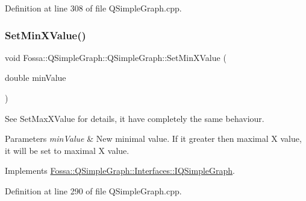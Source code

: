 Definition at line 308 of file Q\+Simple\+Graph.\+cpp.

\mbox{\label{class_fossa_1_1_q_simple_graph_1_1_q_simple_graph_a0eef21e58d8c85f6083d73857f871639}} 
\subsubsection{\texorpdfstring{Set\+Min\+X\+Value()}{SetMinXValue()}}
{\footnotesize\ttfamily void Fossa\+::\+Q\+Simple\+Graph\+::\+Q\+Simple\+Graph\+::\+Set\+Min\+X\+Value (\begin{DoxyParamCaption}\item[{double}]{min\+Value }\end{DoxyParamCaption})\hspace{0.3cm}{\ttfamily [virtual]}}



See Set\+Max\+X\+Value for details, it have completely the same behaviour. 


\begin{DoxyParams}{Parameters}
{\em min\+Value} & New minimal value. If it greater then maximal X value, it will be set to maximal X value. \\
\hline
\end{DoxyParams}


Implements \hyperlink{class_fossa_1_1_q_simple_graph_1_1_interfaces_1_1_i_q_simple_graph_a4266725f87b306e572ad1ae37cfab4ef}{Fossa\+::\+Q\+Simple\+Graph\+::\+Interfaces\+::\+I\+Q\+Simple\+Graph}.



Definition at line 290 of file Q\+Simple\+Graph.\+cpp.

\mbox{\label{class_fossa_1_1_q_simple_graph_1_1_q_simple_graph_a8bf9aac5856a659eb89abffca7750df0}} 
